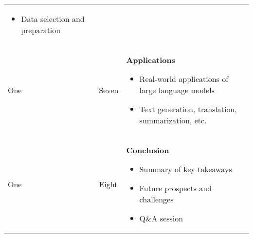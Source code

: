 \documentclass[a4paper, 11pt]{article}
\begin{document}
\begin{center}
\begin{tabular}{ |p{1cm}|p{1cm}||p{10cm}|  }
\begin{itemize}[topsep=0pt, partopsep=0pt, itemsep=0pt, parsep=0pt]
\item Data selection and preparation
\end{itemize}
\\
One	&  	Seven    	&  	\textbf{Applications}
\begin{itemize}[topsep=0pt, partopsep=0pt, itemsep=0pt, parsep=0pt]
\item Real-world applications of large language models
\item Text generation, translation, summarization, etc.
\end{itemize}
\\
One 	&   	Eight  	&   	\textbf{Conclusion} 
\begin{itemize}[topsep=0pt, partopsep=0pt, itemsep=0pt, parsep=0pt]
\item Summary of key takeaways
\item Future prospects and challenges
\item Q\&A session
\end{itemize}
\\
 \hline
\end{tabular}
\end{center}
\end{document}
